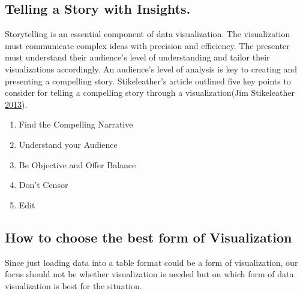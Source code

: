 \documentclass[]{book}
\providecommand{\tightlist}{%
  \setlength{\itemsep}{0pt}\setlength{\parskip}{0pt}}
\begin{document}
\hypertarget{telling-a-story-with-insights.}{%
\subsection{Telling a Story with Insights.}\label{telling-a-story-with-insights.}}

Storytelling is an essential component of data visualization. The visualization must communicate complex ideas with precision and efficiency. The presenter must understand their audience's level of understanding and tailor their visualizations accordingly. An audience's level of analysis is key to creating and presenting a compelling story. Stikeleather's article outlined five key points to consider for telling a compelling story through a visualization(Jim Stikeleather \protect\hyperlink{ref-storytelling_with_data}{2013}).

\begin{enumerate}
\def\labelenumi{\arabic{enumi}.}
\tightlist
\item
  Find the Compelling Narrative
\item
  Understand your Audience
\item
  Be Objective and Offer Balance
\item
  Don't Censor
\item
  Edit
\end{enumerate}

\hypertarget{how-to-choose-the-best-form-of-visualization}{%
\subsection{How to choose the best form of Visualization}\label{how-to-choose-the-best-form-of-visualization}}

Since just loading data into a table format could be a form of visualization, our focus should not be whether visualization is needed but on which form of data visualization is best for the situation.
\end{document}
